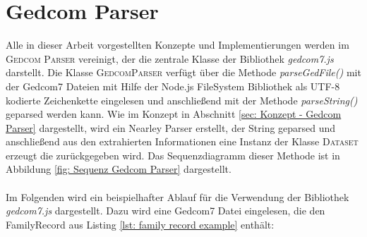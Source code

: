 \section{Gedcom Parser}
\label{sec: Implementierung - Gedcom Parser}
Alle in dieser Arbeit vorgestellten Konzepte und Implementierungen werden im \textsc{Gedcom Parser} vereinigt, der die zentrale Klasse der Bibliothek \textit{gedcom7.js} darstellt. Die Klasse \textsc{GedcomParser} verfügt über die Methode \textit{parseGedFile()} mit der Gedcom7 Dateien mit Hilfe der Node.js FileSystem Bibliothek als UTF-8 kodierte Zeichenkette eingelesen und anschließend mit der Methode \textit{parseString()} geparsed werden kann. Wie im Konzept in Abschnitt \ref{sec: Konzept - Gedcom Parser} dargestellt, wird ein Nearley Parser erstellt, der String geparsed und anschließend aus den extrahierten Informationen eine Instanz der Klasse \textsc{Dataset} erzeugt die zurückgegeben wird. Das Sequenzdiagramm dieser Methode ist in Abbildung \ref{fig: Sequenz Gedcom Parser} dargestellt.
\\ \\
Im Folgenden wird ein beispielhafter Ablauf für die Verwendung der Bibliothek \textit{gedcom7.js} dargestellt. Dazu wird eine Gedcom7 Datei eingelesen, die den FamilyRecord aus Listing \ref{lst: family record example} enthält:

